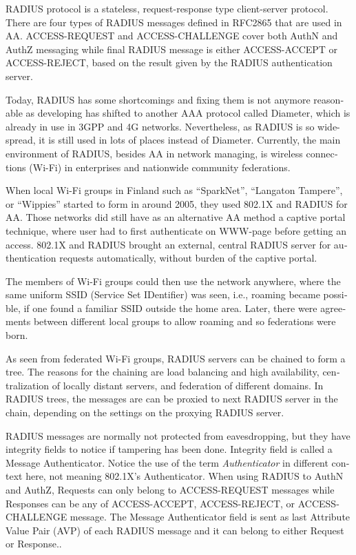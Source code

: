 \documentclass[12pt,a4paper,english]{tutthesis}
\begin{document}
\begin{otherlanguage}{english}
RADIUS protocol is a stateless, request-response type client-server
protocol. 
There are four types of RADIUS messages defined in RFC2865 that are
used in AA. ACCESS-REQUEST and ACCESS-CHALLENGE cover both AuthN and
AuthZ messaging while final RADIUS message is either
ACCESS-ACCEPT or ACCESS-REJECT, based on the
result given by the RADIUS authentication server.

Today, RADIUS has some shortcomings and fixing them is not anymore
reasonable as developing has shifted to another AAA protocol called
Diameter, which is already in use in 3GPP and 4G
networks\cite{diameter}.  Nevertheless, as RADIUS is so wide-spread,
it is still used in lots of places instead of Diameter.  Currently,
the main environment of RADIUS, besides AA in network managing, is wireless
connections (Wi-Fi) in enterprises and nationwide community
federations.


When local Wi-Fi groups in Finland such as ``SparkNet'', ``Langaton
Tampere'', or ``Wippies'' started to form in around 2005, they used
802.1X and RADIUS for AA. Those networks did still have as an
alternative AA method a captive portal technique, where user had to
first authenticate on WWW-page before getting an access.  802.1X and
RADIUS brought an external, central RADIUS server for authentication
requests automatically, without burden of the captive portal.

The members of Wi-Fi groups could then use the network anywhere, where
the same uniform SSID (Service Set IDentifier) was seen, i.e., roaming
became possible, if one found a familiar SSID outside the home area.
Later, there were agreements between different local groups to allow
roaming and so federations were born.

As seen from federated Wi-Fi groups, RADIUS servers can be chained to
form a tree. The reasons for the chaining are load balancing and high
availability, centralization of locally distant servers, and
federation of different domains. In RADIUS trees, the messages are
can be proxied to next RADIUS server in the chain, depending on the settings
on the proxying RADIUS server.

RADIUS messages are normally not protected from eavesdropping, but they have
integrity fields to notice if tampering has been done. 
Integrity field is called a Message Authenticator.
Notice the use of the term \emph{Authenticator} in different context here, not
meaning 802.1X's Authenticator.
When using RADIUS to AuthN and AuthZ, Requests can only belong to ACCESS-REQUEST messages while
Responses can be any of ACCESS-ACCEPT, ACCESS-REJECT, or ACCESS-CHALLENGE message.
The Message Authenticator field is sent as last Attribute Value Pair (AVP)
of each RADIUS message and it can belong 
to either Request or Response.\cite[p.20]{radiusbook}.


\end{otherlanguage}
\end{document}
